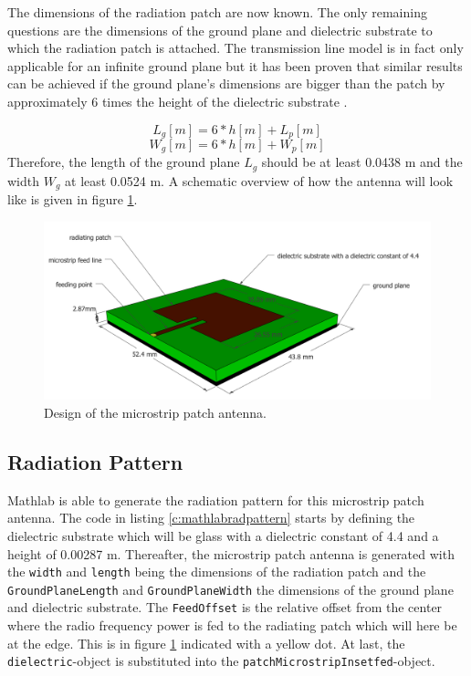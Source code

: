 The dimensions of the radiation patch are now known. The only remaining questions are the dimensions of the ground plane and dielectric substrate to which the 
radiation patch is attached. The transmission line model is in fact only applicable for an infinite ground plane but it has been proven that similar results
can be achieved if the ground plane's dimensions are bigger than the patch by approximately 6 times the height of the dielectric substrate \cite{J14_antennadesign,J15_antennadesign}.

\begin{equation} 
L_{g} [m] = 6 * h [m] + L_p [m]
\end{equation}
\begin{equation} 
W_{g} [m] = 6 * h [m] + W_p [m]
\end{equation}
Therefore, the length of the ground plane $L_{g}$ should be at least 0.0438 m and the width $W_{g}$ at least 0.0524 m.
A schematic overview of how the antenna will look like is given in figure \ref{fig:antennadesign}.
\begin{figure}[h!]
\centering
  \includegraphics[width=\textwidth]{../images/MicrostripAntenna.png}
  \caption{Design of the microstrip patch antenna.}
  \label{fig:antennadesign}
\end{figure}

\subsection{Radiation Pattern}
Mathlab is able to generate the radiation pattern for this microstrip patch antenna.
The code in  listing \ref{c:mathlabradpattern} starts by defining the dielectric substrate which will be glass with a dielectric constant
of 4.4 and a height of 0.00287 m. Thereafter, the microstrip patch antenna is generated with the \verb|width| and \verb|length| being the dimensions
of the radiation patch and the \verb|GroundPlaneLength| and \verb|GroundPlaneWidth| the dimensions of the ground plane and dielectric substrate.
The \verb|FeedOffset| is the relative offset from the center where the radio frequency power is fed to the radiating patch which will here be
at the edge. This is in figure \ref{fig:antennadesign} indicated with a yellow dot. At last, the \verb|dielectric|-object is substituted into the 
\verb|patchMicrostripInsetfed|-object.

